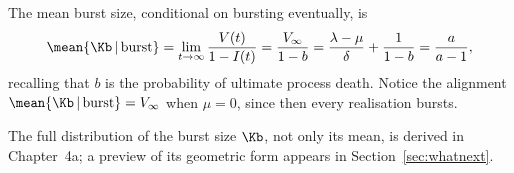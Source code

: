 \begin{corollary}
\label{cor:burstmean}
The mean burst size, conditional on bursting eventually, is
\begin{equation}
\label{eq:burstmean}
\mean{\Kb \,|\,\text{burst}} = \lim_{t\to \infty} \frac{V(t)}{1 - I(t)}
= \frac{V_{\infty}}{1 - b}
= \frac{\lambda-\mu}{\delta} + \frac{1}{1-b}
= \frac{a}{a-1},
\end{equation}
recalling that $b$ is the probability of ultimate process death. Notice the
alignment $\mean{\Kb\,|\,\text{burst}} = V_\infty$ when $\mu=0$, since then
every realisation bursts.
\end{corollary}

The full distribution of the burst size $\Kb$, not only its mean, is derived in
Chapter~4a; a preview of its geometric form appears in
Section~\ref{sec:whatnext}.
